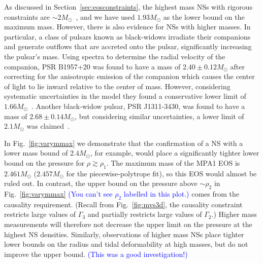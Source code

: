\documentclass[twocolumn,prd,amssymb,aps,nofootinbib,showpacs,epsf]{revtex4}
\newcommand\les[2]{\textcolor{blue}{{#1}\sout{#2}}}
\begin{document}
As discussed in Section~\ref{sec:eosconstraints}, the highest mass NSs with rigorous constraints are $\sim 2M_\odot$~\cite{DemorestPennucciRansom2010, AntoniadisFreireWex2013}, and we have used $1.93M_\odot$ as the lower bound on the maximum mass. However, there is also evidence for NSs with higher masses. In particular, a class of pulsars known as black-widows irradiate their companions and generate outflows that are accreted onto the pulsar, significantly increasing the pulsar's mass. Using spectra to determine the radial velocity of the companion, PSR B1957+20 was found to have a mass of $2.40\pm0.12M_\odot$ after correcting for the anisotropic emission of the companion which causes the center of light to lie inward relative to the center of mass. However, considering systematic uncertainties in the model they found a conservative lower limit of $1.66M_\odot$~\cite{VanKerkwijkBretonKulkarni2011}. Another black-widow pulsar, PSR J1311-3430, was found to have a mass of $2.68\pm0.14M_\odot$, but considering similar uncertainties, a lower limit of $2.1M_\odot$ was claimed~\cite{RomaniFilippenkoSilverman2012}. 

In Fig.~\ref{fig:varymmax} we demonstrate that the confirmation of a NS with a lower mass bound of $2.4M_\odot$, for example, would place a significantly tighter lower bound on the pressure for $\rho \gtrsim \rho_1$. The maximum mass of the MPA1 EOS is $2.461M_\odot$ ($2.457M_\odot$ for the piecewise-polytrope fit), so this EOS would almost be ruled out. In contrast, the upper bound on the pressure above $\sim\rho_2$ in Fig.~\ref{fig:varymmax} \les{(You can't see $\rho_2$ labelled in this plot.)}{} comes from the causality requirement. (Recall from Fig.~\ref{fig:mvs3d}, the causality constraint restricts large values of $\Gamma_3$ and partially restricts large values of $\Gamma_2$.) Higher mass measurements will therefore not decrease the upper limit on the pressure at the highest NS densities. Similarly, observations of higher mass NSs place tighter lower bounds on the radius and tidal deformability at high masses, but do not improve the upper bound. \les{(This was a good investigation!)}{}
\end{document}
